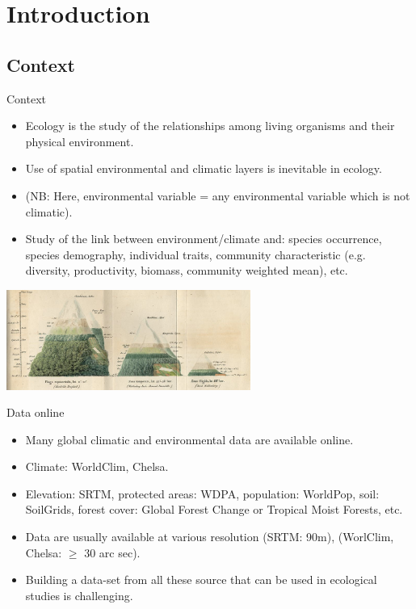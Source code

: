\documentclass[10pt,table,dvipsnames,compress]{beamer}
\begin{document}
\section{Introduction}
\label{sec:org870b61b}

\subsection{Context}
\label{sec:org2fbd48b}

\begin{frame}[label={sec:org6179119}]{Context}
\begin{itemize}
\item Ecology is the study of the relationships among living organisms and their physical environment.
\item Use of spatial environmental and climatic layers is inevitable in ecology.
\item (NB: Here, environmental variable = any environmental variable which is not climatic).
\item Study of the link between environment/climate and: species occurrence, species demography, individual traits, community characteristic (e.g. diversity, productivity, biomass, community weighted mean), etc.
\end{itemize}

\begin{center}
\includegraphics[width=0.6\textwidth]{figs/isothermes-elevation.jpg}
\end{center}
\end{frame}

\begin{frame}[label={sec:orgdc932c6}]{Data online}
\begin{itemize}
\item Many global climatic and environmental data are available online.
\item Climate: WorldClim, Chelsa.
\item Elevation: SRTM, protected areas: WDPA, population: WorldPop, soil: SoilGrids, forest cover: Global Forest Change or Tropical Moist Forests, etc.
\item Data are usually available at various resolution (SRTM: 90m), (WorlClim, Chelsa: \(\ge\) 30 arc sec).
\item Building a data-set from all these source that can be used in ecological studies is challenging.
\end{itemize}
\end{frame}
\end{document}
